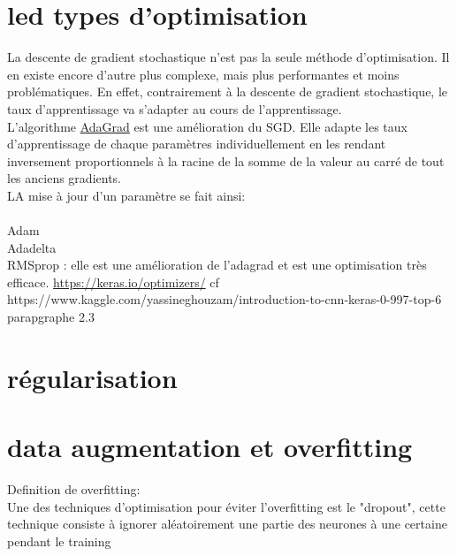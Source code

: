 \documentclass[openany,14pt,fleqn]{book} %
\begin{document}
\section{led types d'optimisation}
La descente de gradient stochastique n'est pas la seule méthode d'optimisation. Il en existe encore d'autre plus complexe, mais plus performantes et moins problématiques. En effet, contrairement à la descente de gradient stochastique, le taux d'apprentissage va s'adapter au cours de l'apprentissage.\\ \break 
L'algorithme \underline{AdaGrad} est une amélioration du SGD. Elle adapte les taux d'apprentissage de chaque paramètres individuellement en les rendant inversement proportionnels à la racine de la somme de la valeur au carré de tout les anciens gradients. $$ $$
LA mise à jour d'un paramètre se fait ainsi:
$$ $$\\
Adam\\
Adadelta\\
RMSprop : elle est une amélioration de l'adagrad et est une optimisation très efficace.
\url{https://keras.io/optimizers/}
cf https://www.kaggle.com/yassineghouzam/introduction-to-cnn-keras-0-997-top-6 parapgraphe 2.3
\section{régularisation }
\section{data augmentation et overfitting}
Definition de overfitting: \\
Une des techniques d'optimisation pour éviter l'overfitting est le "dropout", cette technique consiste à ignorer aléatoirement une partie des neurones à une certaine pendant le training
\end{document}
